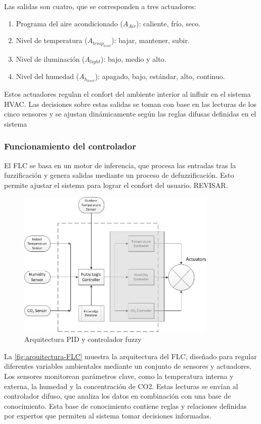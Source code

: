 Las salidas son cuatro, que se corresponden a tres actuadores:
\begin{enumerate}
	\item Programa del aire acondicionado ($A_{Air}$): caliente, frío, seco.
	\item Nivel de temperatura ($A_{temp_{level}}$): bajar, mantener, subir.
	\item Nivel de iluminación ($A_{light}$): bajo, medio y alto.
	\item Nivel del humedad ($A_{h_{level}}$): apagado, bajo, estándar, alto, continuo.
\end{enumerate}

Estos actuadores regulan el confort del ambiente interior al influir en el sistema HVAC. Las decisiones sobre estas salidas se toman con base en las lecturas de los cinco sensores y se ajustan dinámicamente según las reglas difusas definidas en el sistema

\subsubsection{Funcionamiento del controlador}

El FLC se basa en un motor de inferencia, que procesa las entradas tras la fuzzificación y genera salidas mediante un proceso de defuzzificación. Esto permite ajustar el sistema para lograr el confort del usuario. REVISAR.

\begin{figure}[H]
	\centering
	\includegraphics[width=0.85\textwidth]{imgs/arquitectura-FLC.JPG}
	\caption{Arquitectura PID y controlador fuzzy}
	\label{fig:arquitectura-FLC}
\end{figure}

La \autoref{fig:arquitectura-FLC} muestra la arquitectura del FLC, diseñado para regular diferentes variables ambientales mediante un conjunto de sensores y actuadores. Los sensores monitorean parámetros clave, como la temperatura interna y externa, la humedad y la concentración de CO2. Estas lecturas se envían al controlador difuso, que analiza los datos en combinación con una base de conocimiento. Esta base de conocimiento contiene reglas y relaciones definidas por expertos que permiten al sistema tomar decisiones informadas.

